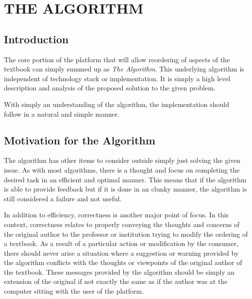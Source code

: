 %
%
%
%

\chapter{THE ALGORITHM}


\section{Introduction}

The core portion of the platform that will allow reordering of aspects of the textbook can simply summed up as \textit{The Algorithm}. This underlying algorithm is independent of technology stack or implementation. It is simply a high level description and analysis of the proposed solution to the given problem.

With simply an understanding of the algorithm, the implementation should follow in a natural and simple manner.

\section{Motivation for the Algorithm}

The algorithm has other items to consider outside simply just solving the given issue. As with most algorithms, there is a thought and focus on completing the desired task in an efficient and optimal manner. This means that if the algorithm is able to provide feedback but if it is done in an clunky manner, the algorithm is still considered a failure and not useful.

In addition to efficiency, correctness is another major point of focus. In this context, correctness relates to properly conveying the thoughts and concerns of the original author to the professor or institution trying to modify the ordering of a textbook. As a result of a particular action or modification by the consumer, there should never arise a situation where a suggestion or warning provided by the algorithm conflicts with the thoughts or viewpoints of the original author of the textbook. These messages provided by the algorithm should be simply an extension of the original if not exactly the same as if the author was at the computer sitting with the user of the platform.

